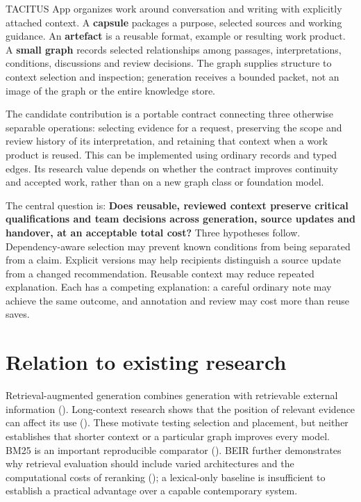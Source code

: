 \documentclass[
  11pt,
]{article}
\let\originalsection\section
\renewcommand{\section}{\Needspace{5\baselineskip}\originalsection}
\begin{document}
TACITUS App organizes work around conversation and writing with
explicitly attached context. A \textbf{capsule} packages a purpose,
selected sources and working guidance. An \textbf{artefact} is a
reusable format, example or resulting work product. A \textbf{small
graph} records selected relationships among passages, interpretations,
conditions, discussions and review decisions. The graph supplies
structure to context selection and inspection; generation receives a
bounded packet, not an image of the graph or the entire knowledge store.

The candidate contribution is a portable contract connecting three
otherwise separable operations: selecting evidence for a request,
preserving the scope and review history of its interpretation, and
retaining that context when a work product is reused. This can be
implemented using ordinary records and typed edges. Its research value
depends on whether the contract improves continuity and accepted work,
rather than on a new graph class or foundation model.

The central question is: \textbf{Does reusable, reviewed context
preserve critical qualifications and team decisions across generation,
source updates and handover, at an acceptable total cost?} Three
hypotheses follow. Dependency-aware selection may prevent known
conditions from being separated from a claim. Explicit versions may help
recipients distinguish a source update from a changed recommendation.
Reusable context may reduce repeated explanation. Each has a competing
explanation: a careful ordinary note may achieve the same outcome, and
annotation and review may cost more than reuse saves.

\section{Relation to existing
research}\label{relation-to-existing-research}

Retrieval-augmented generation combines generation with retrievable
external information ().
Long-context research shows that the position of relevant evidence can
affect its use (). These motivate
testing selection and placement, but neither establishes that shorter
context or a particular graph improves every model. BM25 is an important
reproducible comparator (). BEIR further demonstrates why retrieval evaluation
should include varied architectures and the computational costs of
reranking (); a
lexical-only baseline is insufficient to establish a practical advantage
over a capable contemporary system.
\end{document}
